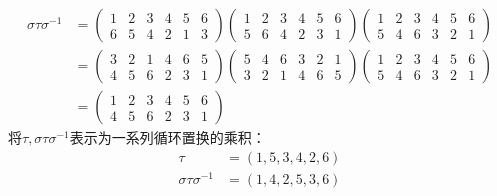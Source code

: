 \begin{solution}
    \begin{equation*}
        \begin{aligned}
            \sigma\tau\sigma^{-1}
            &=
            \begin{pmatrix}
                1 & 2 & 3 & 4 & 5 & 6 \\
                6 & 5 & 4 & 2 & 1 & 3
            \end{pmatrix}\begin{pmatrix}
                1 & 2 & 3 & 4 & 5 & 6 \\
                5 & 6 & 4 & 2 & 3 & 1
            \end{pmatrix}\begin{pmatrix}
                1 & 2 & 3 & 4 & 5 & 6 \\
                5 & 4 & 6 & 3 & 2 & 1
            \end{pmatrix}\\
            &=
            \begin{pmatrix}
                3 & 2 & 1 & 4 & 6 & 5 \\
                4 & 5 & 6 & 2 & 3 & 1
            \end{pmatrix}\begin{pmatrix}
                5 & 4 & 6 & 3 & 2 & 1 \\
                3 & 2 & 1 & 4 & 6 & 5
            \end{pmatrix}\begin{pmatrix}
                1 & 2 & 3 & 4 & 5 & 6 \\
                5 & 4 & 6 & 3 & 2 & 1
            \end{pmatrix}\\
            &=
            \begin{pmatrix}
                1 & 2 & 3 & 4 & 5 & 6 \\
                4 & 5 & 6 & 2 & 3 & 1
            \end{pmatrix}
        \end{aligned}
    \end{equation*}
将$\tau, \sigma\tau\sigma^{-1}$表示为一系列循环置换的乘积：
\begin{equation*}
    \begin{aligned}
        \tau&=(1,5,3,4,2,6)\\
        \sigma\tau\sigma^{-1}&=(1,4,2,5,3,6)
    \end{aligned}
\end{equation*}
    
\end{solution}